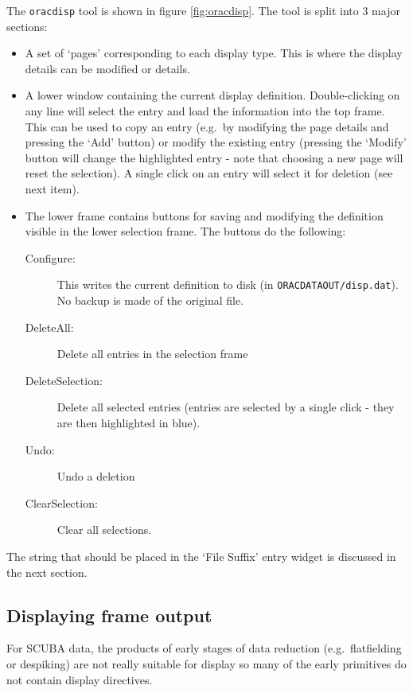 \documentclass[twoside,11pt]{article}
\newcommand{\xlabel}[1]{}
\renewcommand{\_}{\texttt{\symbol{95}}}
\begin{document}
The \texttt{oracdisp} tool is shown in figure \ref{fig:oracdisp}. The
tool is split into 3 major sections:

\begin{itemize}
\item A set of `pages' corresponding to each display type. This is where
the display details can be modified or details.
\item A lower window containing the current display
definition. Double-clicking on any line will select the entry and load the
information into the top frame. This can be used to copy an entry (e.g.\
by modifying the page details and pressing the `Add' button) or
modify the existing entry (pressing the `Modify' button will change the
highlighted entry - note that choosing a new page will reset the
selection). A single click on an entry will select it for deletion (see next item).

\item  The lower frame contains buttons for saving and modifying the
definition visible in the lower selection frame. The buttons do the following:
\begin{description}
\item[Configure:] This writes the current definition to disk (in
\texttt{ORAC\_DATA\_OUT/disp.dat}). No backup is made of the original file.
\item[DeleteAll:] Delete all entries in the selection frame
\item[DeleteSelection:] Delete all selected entries (entries are selected by a
single click - they are then highlighted in blue).
\item[Undo:] Undo a deletion
\item[ClearSelection:] Clear all selections.

\end{description}
\end{itemize}

The string that should be placed in the `File Suffix' entry
widget is discussed in the next section.

\subsection{Displaying frame output\xlabel{displaying_frame_output}}

For SCUBA data, the products of early stages of data reduction
(e.g.\ flatfielding or despiking) are not really suitable for display
so many of the early primitives do not contain display directives.
\end{document}
